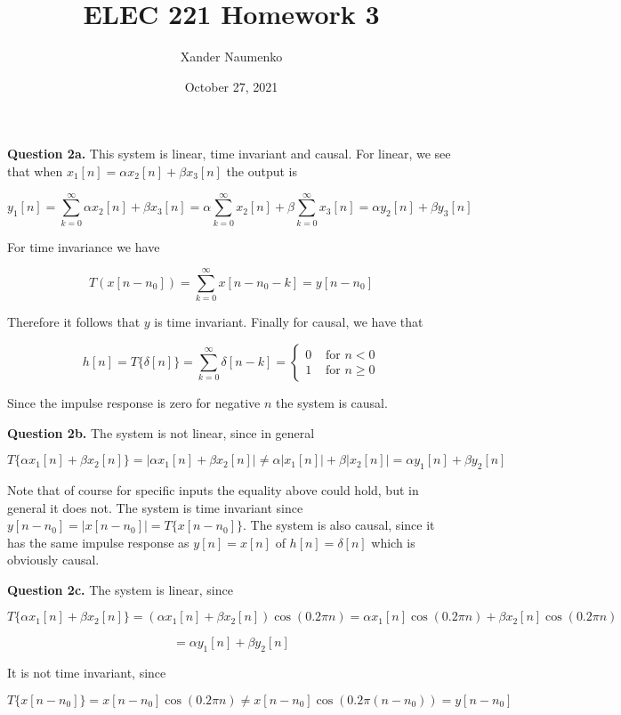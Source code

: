 \documentclass[letterpaper, reqno,11pt]{article}
\begin{document}
\title{ELEC 221 Homework 3}
\date{October 27, 2021}
\author{Xander Naumenko}
\maketitle

{\noindent\bf Question 2a.} This system is linear, time invariant and causal. For linear, we see that when $x_1[n]=\alpha x_2[n]+\beta x_3[n]$ the output is

$$
    y_1[n] = \sum_{k=0}^{\infty} \alpha x_2[n]+\beta x_3[n]=\alpha\sum_{k=0}^\infty x_2[n]+\beta\sum_{k=0}^\infty x_3[n]=\alpha y_2[n]+\beta y_3[n]
$$

For time invariance we have 

$$
    T(x[n-n_0]) = \sum_{k=0}^\infty x[n-n_0-k]=y[n-n_0]
$$

Therefore it follows that $y$ is time invariant. Finally for causal, we have that 

$$
    h[n] = T\{\delta[n]\}=\sum_{k=0}^\infty \delta[n-k]=\begin{cases}
        0&\text{ for }n<0\\
        1&\text{ for }n \geq 0
    \end{cases}
$$

Since the impulse response is zero for negative $n$ the system is causal. 

{\noindent\bf Question 2b.} The system is not linear, since in general

$$
    T\{\alpha x_1[n] + \beta x_2[n]\} = |\alpha x_1[n] + \beta x_2[n]|\neq \alpha |x_1[n]| + \beta |x_2[n]|=\alpha y_1[n]+\beta y_2[n]
$$

Note that of course for specific inputs the equality above could hold, but in general it does not. The system is time invariant since $y[n-n_0]=|x[n-n_0]|=T\{x[n-n_0]\}$. The system is also causal, since it has the same impulse response as $y[n] = x[n]$ of $h[n]=\delta[n]$ which is obviously causal. 

{\noindent\bf Question 2c.} The system is linear, since 

$$
    T\{\alpha x_1[n] + \beta x_2[n]\}=(\alpha x_1[n] + \beta x_2[n])\cos(0.2\pi n)=\alpha x_1[n]\cos(0.2\pi n) + \beta x_2[n]\cos(0.2\pi n)
$$

$$
    =\alpha y_1[n] + \beta y_2[n]
$$

It is not time invariant, since 

$$
    T\{x[n-n_0]\}=x[n-n_0]\cos(0.2\pi n)\neq x[n-n_0]\cos(0.2\pi(n-n_0))=y[n-n_0]
$$
\end{document}
